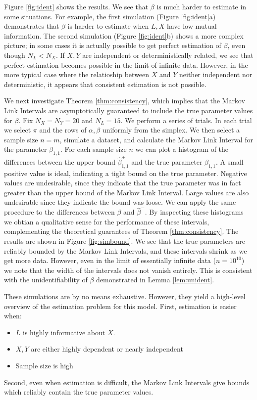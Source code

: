 \documentclass{article}
\theoremstyle{definition}
\begin{document}
Figure \ref{fig:ident} shows the results.  We see that $\beta$ is much harder to estimate in some situations.  For example, the first simulation (Figure \ref{fig:ident}a) demonstrates that $\beta$ is harder to estimate when $L,X$ have low mutual information.  The second simulation (Figure \ref{fig:ident}b) shows a more complex picture; in some cases it is actually possible to get perfect estimation of $\beta$, even though $N_L<N_X$.  If $X,Y$ are independent or deterministically related, we see that perfect estimation becomes possible in the limit of infinite data.  However, in the more typical case where the relatioship between $X$ and $Y$ neither independent nor deterministic, it appears that consistent estimation is not possible.  
 
We next investigate Theorem \ref{thm:consistency}, which implies that the Markov Link Intervals are asymptotically guaranteed to include the true parameter values for $\beta$.   Fix $N_X=N_Y=20$ and $N_L=15$.  We perform a series of trials.  In each trial we select $\pi$ and the rows of $\alpha,\beta$ uniformly from the simplex.  We then select a sample size $n=m$, simulate a dataset, and calculate the Markov Link Interval for the parameter $\beta_{1,1}$.  For each sample size $n$ we can plot a histogram of the differences between the upper bound $\hat \beta^{+}_{1,1}$ and the true parameter $\beta_{1,1}$.  A small positive value is ideal, indicating a tight bound on the true parameter.  Negative values are undesirable, since they indicate that the true parameter was in fact greater than the upper bound of the Markov Link Interval.  Large values are also undesirable since they indicate the bound was loose.  We can apply the same procedure to the differences between $\beta$ and $\hat \beta^{-}$.  By inspecting these histograms we obtian a qualitative sense for the performance of these intervals, complementing the theoretical guarantees of Theorem \ref{thm:consistency}.  The results are shown in Figure \ref{fig:simbound}.  We see that the true parameters are reliably bounded by the Markov Link Intervals, and these intervals shrink as we get more data.  However, even in the limit of essentially infinite data ($n=10^{10}$) we note that the width of the intervals does not vanish entirely.  This is consistent with the unidentifiability of $\beta$ demonstrated in Lemma \ref{lem:unident}.

These simulations are by no means exhaustive.  However, they yield a high-level overview of the estimation problem for this model.  First, estimation is easier when:
\begin{itemize}
    \item $L$ is highly informative about $X$.  
    \item $X,Y$ are either highly dependent or nearly independent
    \item Sample size is high
\end{itemize}
Second, even when estimation is difficult, the Markov Link Intervals give bounds which reliably contain the true parameter values.
\end{document}
